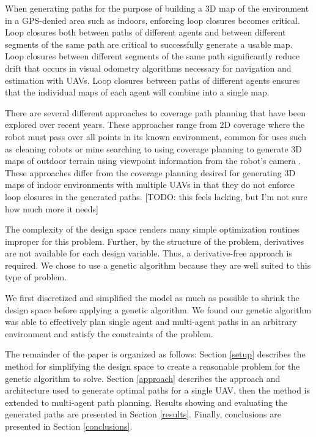 \documentclass[letterpaper, 10 pt, conference]{ieeeconf}  %
\newcommand{\todo}[1]{{\color{blue}[TODO: #1]}}
\begin{document}
When generating paths for the purpose of building a 3D map of the environment in a GPS-denied area such as indoors, enforcing loop closures becomes critical. Loop closures both between paths of different agents and between different segments of the same path are critical to successfully generate a usable map. Loop closures between different segments of the same path significantly reduce drift that occurs in visual odometry algorithms necessary for navigation and estimation with UAVs. Loop closures between paths of different agents ensures that the individual maps of each agent will combine into a single map.

There are several different approaches to coverage path planning that have been explored over recent years. These approaches range from 2D coverage where the robot must pass over all points in its known environment, common for uses such as cleaning robots or mine searching \cite{Choset2001} to using coverage planning to generate 3D maps of outdoor terrain using viewpoint information from the robot's camera \cite{Bircher2016}. These approaches differ from the coverage planning desired for generating 3D maps of indoor environments with multiple UAVs in that they do not enforce loop closures in the generated paths. \todo{this feels lacking, but I'm not sure how much more it needs}

The complexity of the design space renders many simple optimization routines improper for this problem. Further, by the structure of the problem, derivatives are not available for each design variable. Thus, a derivative-free approach is required. We chose to use a genetic algorithm because they are well suited to this type of problem.

We first discretized and simplified the model as much as possible to shrink the design space before applying a genetic algorithm. We found our genetic algorithm was able to effectively plan single agent and multi-agent paths in an arbitrary environment and satisfy the constraints of the problem.

The remainder of the paper is organized as follows: Section \ref{setup} describes the method for simplifying the design space to create a reasonable problem for the genetic algorithm to solve. Section \ref{approach} describes the approach and architecture used to generate optimal paths for a single UAV, then the method is extended to multi-agent path planning.
Results showing and evaluating the generated paths are presented in Section \ref{results}. Finally, conclusions are presented in Section \ref{conclusions}.
\end{document}
